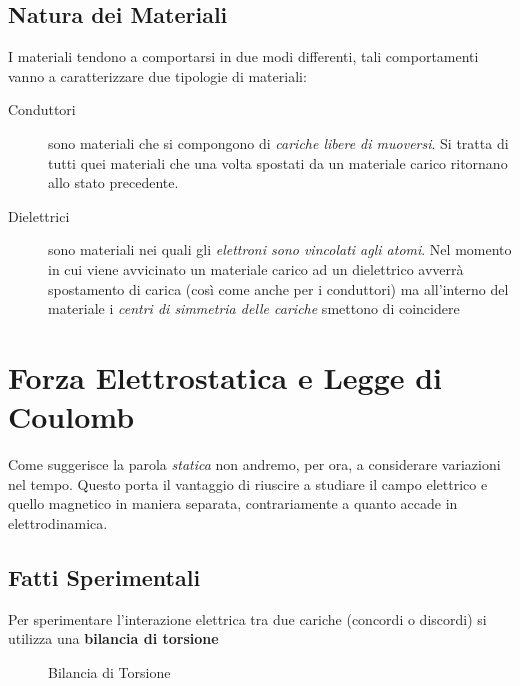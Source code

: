 \subsection{Natura dei Materiali}
I materiali tendono a comportarsi in due modi differenti, tali comportamenti vanno a caratterizzare due tipologie di materiali: 

\begin{description}
	\item[Conduttori] sono materiali che si compongono di \textit{cariche libere di muoversi}. Si tratta di tutti quei materiali che una volta spostati da un materiale carico ritornano allo stato precedente.
	\item[Dielettrici] sono materiali nei quali gli \textit{elettroni sono vincolati agli atomi}. Nel momento in cui viene avvicinato un materiale carico ad un dielettrico avverrà spostamento di carica (così come anche per i conduttori) ma all'interno del materiale i \textit{centri di simmetria delle cariche} smettono di coincidere
\end{description}

\section{Forza Elettrostatica e Legge di Coulomb}

Come suggerisce la parola \textit{statica} non andremo, per ora, a considerare variazioni nel tempo. Questo porta il vantaggio di riuscire a studiare il campo elettrico e quello magnetico in maniera separata, contrariamente a quanto accade in elettrodinamica. 

\subsection{Fatti Sperimentali}
Per sperimentare l'interazione elettrica tra due cariche (concordi o discordi) si utilizza una \textbf{bilancia di torsione}

\medskip

\begin{figure} [ht]
	\centering
	\caption{Bilancia di Torsione}
\end{figure}

